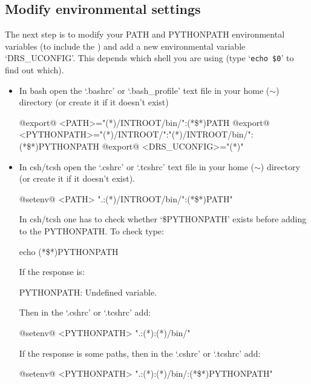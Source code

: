 \subsection{Modify environmental settings}
\label{ch:install:installunix:environ_settings}

The next step is to modify your PATH and PYTHONPATH environmental variables (to include the \InstallDIR) and add a new environmental variable `DRS\_UCONFIG'. This depends which shell you are using (type `\lstinline[style=bashstyle]{echo $0}' to find out which).

\begin{itemize}
	\item In bash open the `.bashrc' or `.bash\_profile' text file in your home ($\sim$) directory (or create it if it doesn't exist)

	\begin{bashbox}[title={e.g. in $\sim$/.bashrc or $\sim$/.bash\_profile}]
	@export@ <PATH>="(*\InstallDIR*)/INTROOT/bin/":{(*\$*)PATH}
	@export@ <PYTHONPATH>="(*\InstallDIR*)/INTROOT/":"(*\InstallDIR*)/INTROOT/bin/":{(*\$*)PYTHONPATH}
	@export@ <DRS_UCONFIG>="(*\userDIR*)"
	\end{bashbox}

	\item In csh/tcsh open the `.cshrc' or `.tcshrc' text file in your home ($\sim$) directory (or create it if it doesn't exist).

	\begin{cshbox}[title={e.g. in $\sim$/.tcshrc}]
	@setenv@ <PATH> ".:(*\InstallDIR*)/INTROOT/bin/":{(*\$*){PATH}}"
	\end{cshbox}

	In csh/tcsh one has to check whether `\$PYTHONPATH' exists before adding to the PYTHONPATH. To check type:

	\begin{cmdbox}
	echo (*\$*)PYTHONPATH
	\end{cmdbox}

	\begin{thighlight}
		If the response is:
		\begin{cmdboxprint}
		PYTHONPATH: Undefined variable.
		\end{cmdboxprint}

		Then in the `.cshrc' or `.tcshrc' add: 
		\begin{cshbox}[title={e.g. in $\sim$/.tcshrc}]
		@setenv@ <PYTHONPATH> ".:(*\InstallDIR*):(*\InstallDIR*)/bin/"
		\end{cshbox}

		If the response is some paths, then in the `.cshrc' or `.tcshrc' add: 
		\begin{cshbox}[title={e.g. in $\sim$/.tcshrc}]
		@setenv@ <PYTHONPATH> ".:(*\InstallDIR*):(*\InstallDIR*)/bin/:(*\$*){PYTHONPATH}"
		\end{cshbox}
	\end{thighlight}

\end{itemize}

